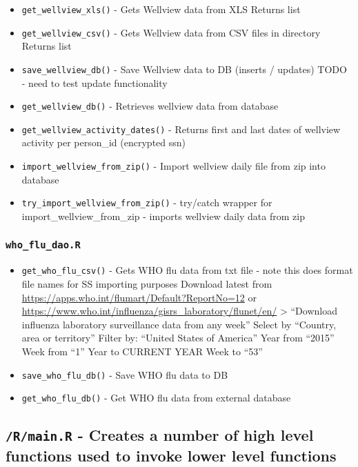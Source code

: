 \documentclass[
]{book}
\providecommand{\tightlist}{%
  \setlength{\itemsep}{0pt}\setlength{\parskip}{0pt}}
\begin{document}
\begin{itemize}
\tightlist
\item
  \texttt{get\_wellview\_xls()} - Gets Wellview data from XLS Returns list
\item
  \texttt{get\_wellview\_csv()} - Gets Wellview data from CSV files in directory Returns list
\item
  \texttt{save\_wellview\_db()} - Save Wellview data to DB (inserts / updates) TODO - need to test update functionality
\item
  \texttt{get\_wellview\_db()} - Retrieves wellview data from database
\item
  \texttt{get\_wellview\_activity\_dates()} - Returns first and last dates of wellview activity per person\_id (encrypted ssn)
\item
  \texttt{import\_wellview\_from\_zip()} - Import wellview daily file from zip into database
\item
  \texttt{try\_import\_wellview\_from\_zip()} - try/catch wrapper for import\_wellview\_from\_zip - imports wellview daily data from zip
\end{itemize}

\hypertarget{who_flu_dao.r}{%
\subsubsection{\texorpdfstring{\texttt{who\_flu\_dao.R}}{who\_flu\_dao.R}}\label{who_flu_dao.r}}

\begin{itemize}
\tightlist
\item
  \texttt{get\_who\_flu\_csv()} - Gets WHO flu data from txt file - note this does format file names for SS importing purposes Download latest from \url{https://apps.who.int/flumart/Default?ReportNo=12} or \url{https://www.who.int/influenza/gisrs_laboratory/flunet/en/} \textgreater{} ``Download influenza laboratory surveillance data from any week'' Select by ``Country, area or territory'' Filter by: ``United States of America'' Year from ``2015'' Week from ``1'' Year to CURRENT YEAR Week to ``53''
\item
  \texttt{save\_who\_flu\_db()} - Save WHO flu data to DB
\item
  \texttt{get\_who\_flu\_db()} - Get WHO flu data from external database
\end{itemize}

\hypertarget{rmain.r---creates-a-number-of-high-level-functions-used-to-invoke-lower-level-functions}{%
\subsection{\texorpdfstring{\texttt{/R/main.R} - Creates a number of high level functions used to invoke lower level functions}{/R/main.R - Creates a number of high level functions used to invoke lower level functions}}\label{rmain.r---creates-a-number-of-high-level-functions-used-to-invoke-lower-level-functions}}
\end{document}
